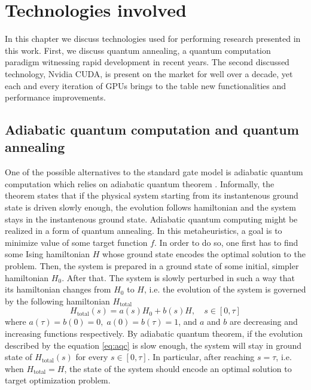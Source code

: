 \chapter{Technologies involved}
\label{chapter:near-term}

 In this chapter we discuss technologies used for performing research presented in this work.
 First, we discuss quantum annealing, a quantum computation paradigm witnessing rapid development in recent years. The second discussed technology, Nvidia CUDA, is present on the market for well over a decade, yet each and every iteration of GPUs brings to the table new functionalities and performance improvements. 


\section{Adiabatic quantum computation and quantum annealing}
One of the possible alternatives to the standard gate model is adiabatic quantum computation which relies on adiabatic quantum theorem \cite{born}. Informally, the theorem states that if the physical system starting from its instantenous ground state is driven slowly enough, the evolution follows hamiltonian and the system stays in the instantenous ground state. Adiabatic quantum computing might be realized in a form of quantum annealing. In this metaheuristics, a goal is to minimize value of some target function $f$. In order to do so, one first has to find some Ising hamiltonian $H$ whose ground state encodes the optimal solution to the problem. Then, the system is prepared in a ground state of some initial, simpler hamiltonian $H_0$. After that. The system is slowly perturbed in such a way that its hamiltonian changes from $H_0$ to $H$, i.e. the evolution of the system is governed by the following hamiltonian $H_\text{total}$
\begin{equation}
    \label{eq:aqc}
    {H}_\text{total}(s) = a(s) {H}_0 + b(s){H}, \quad s \in [0, \tau]
\end{equation}
where $a(\tau) = b(0) = 0, \; a(0) = b(\tau) = 1$, and $a$ and $b$ are decreasing and increasing functions respectively.
By adiabatic quantum theorem, if the evolution described by the equation \eqref{eq:aqc} is slow enough, the system will stay in ground state of ${H}_\text{total}(s)$ for every $s \in [0, \tau]$. In particular, after reaching $s=\tau$, i.e. when $H_\text{total} = H$, the state of the system should encode an optimal solution to target optimization problem.

